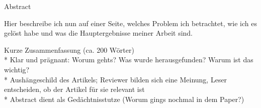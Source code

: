 \begin{center} 
\huge Abstract
\end{center}

Hier beschreibe ich nun auf einer Seite, welches Problem ich betrachtet, wie ich es gelöst habe
und was die Hauptergebnisse meiner Arbeit sind.

Kurze Zusammenfassung (ca. 200 Wörter)\\
* Klar und prägnant: Worum gehts? Was wurde herausgefunden? Warum ist das wichtig?\\
* Aushängeschild des Artikels; Reviewer bilden sich eine Meinung, Leser entscheiden, ob der Artikel für sie relevant ist\\
* Abstract dient als Gedächtnisstutze (Worum gings nochmal in dem Paper?)

